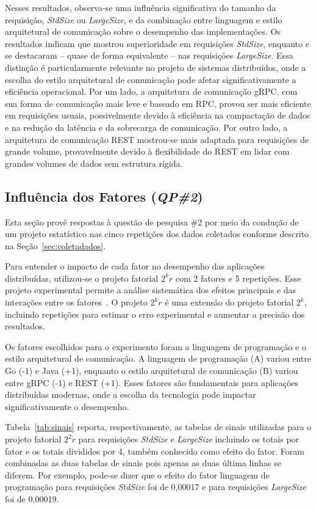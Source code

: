 Nesses resultados, observa-se uma influência significativa do tamanho da requisição, \textit{StdSize} ou \textit{LargeSize}, e da combinação entre linguagem e estilo arquitetural de comunicação sobre o desempenho das implementações. Os resultados indicam que 
\textit{\gogrpc{}} mostrou superioridade em requisições {\em StdSize}, enquanto \gorest{} e \javarest{} se destacaram -- quase de forma equivalente -- nas requisições {\em LargeSize}. 
Essa distinção é particularmente relevante no projeto de sistemas distribuídos, onde a escolha do estilo arquitetural de comunicação pode afetar significativamente a eficiência operacional. 
Por um lado, a arquitetura de comunicação gRPC, com sua forma de comunicação mais leve e baseado em RPC, provou ser mais eficiente em requisições usuais, possivelmente devido à
eficiência na compactação de dados e na redução da latência e da sobrecarga de comunicação.
Por outro lado, a arquitetura de comunicação REST mostrou-se mais adaptada para requisições de grande volume, provavelmente devido 
à flexibilidade do REST em lidar com grandes volumes de dados sem estrutura rígida. 

\subsection{Influência dos Fatores ({\em QP\#2})}
Esta seção provê respostas à questão de pesquisa \#2 por meio da condução de um projeto estatístico nas cinco repetições dos dados coletados conforme descrito na Seção~\ref{sec:coletadados}. 


Para entender o impacto de cada fator no desempenho das aplicações distribuídas, utilizou-se o projeto fatorial \(2^{k}r\) com 2 fatores e 5 repetições. 
Esse projeto experimental permite a análise sistemática dos efeitos principais e das interações entre os fatores~\cite{jain1991}.
O projeto \(2^{k}r\) é uma extensão do projeto fatorial \(2^{k}\), incluindo repetições para estimar o erro experimental e aumentar a precisão dos resultados.

Os fatores escolhidos para o experimento foram a linguagem de programação e o estilo arquitetural de comunicação. A linguagem de programação (A) variou entre Go (-1) e Java (+1), enquanto o estilo arquitetural de comunicação (B) variou entre gRPC (-1) e REST (+1). Esses fatores são fundamentais para aplicações distribuídas modernas, onde a escolha da tecnologia pode impactar significativamente o desempenho.

Tabela~\ref{tab:sinais} reporta, respectivamente, as tabelas de sinais utilizadas para o projeto fatorial \(2^{2}r\) para requisições \textit{StdSize} e \textit{LargeSize} incluindo os totais por fator e os totais divididos por 4, também conhecido como efeito do fator. Foram combinadas as duas tabelas de sinais pois apenas as duas última linhas se diferem. Por exemplo, pode-se dizer que o 
efeito do fator linguagem de programação para requisições {\em StdSize} foi de 0,00017
e para requisições {\em LargeSize} foi de 0,00019.

